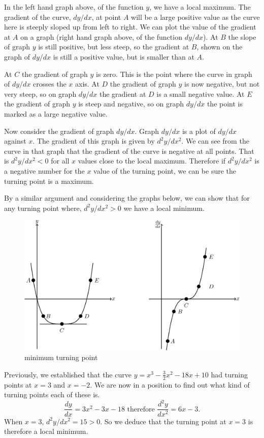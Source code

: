 \documentclass[
  11pt,
  oneside]{book}
\newcommand{\slide}{}
\theoremstyle{definition}
\theoremstyle{definition}
\theoremstyle{definition}
\theoremstyle{definition}
\theoremstyle{remark}
\begin{document}
In the left hand graph above, of the function \(y\), we have a local maximum. The gradient of the curve, \(dy/dx\), at point \(A\) will be a large positive value as the curve here is steeply sloped up from left to right. We can plot the value of the gradient at \(A\) on a graph (right hand graph above, of the function \(dy/dx\)). At \(B\) the slope of graph \(y\) is still positive, but less steep, so the gradient at \(B\), shown on the graph of \(dy/dx\) is still a positive value, but is smaller than at \(A\).

At \(C\) the gradient of graph \(y\) is zero. This is the point where the curve in graph of \(dy/dx\) crosses the \(x\) axis. At \(D\) the gradient of graph \(y\) is now negative, but not very steep, so on graph \(dy/dx\) the gradient at \(D\) is a small negative value. At \(E\) the gradient of graph \(y\) is steep and negative, so on graph \(dy/dx\) the point is marked as a large negative value.

Now consider the gradient of graph \(dy/dx\). Graph \(dy/dx\) is a plot of \(dy/dx\) against \(x\). The gradient of this graph is given by \(d^2y/dx^2\). We can see from the curve in that graph that the gradient of the curve is negative at all points. That is \(d^2y/dx^2<0\) for all \(x\) values close to the local maximum. Therefore if \(d^2y/dx^2\) is a negative number for the \(x\) value of the turning point, we can be sure the turning point is a maximum.
\slide

By a similar argument and considering the graphs below, we can show that for any turning point where, \(d^2y/dx^2>0\) we have a local minimum.

\begin{figure}

{\centering \includegraphics[width=0.6\linewidth]{tikztopng-figure9} 

}

\caption{minimum turning point}\label{fig:unnamed-chunk-19}
\end{figure}
\slide

Previously, we established that the curve \(y = x^3-\frac32 x^2-18x+10\) had turning points at \(x=3\) and \(x=-2\). We are now in a position to find out what kind of turning points each of these is.
\[
\frac{dy}{dx} = 3x^2-3x-18\text{ therefore } \frac{d^2y}{dx^2} = 6x-3.
\]
When \(x = 3\), \(d^2y/dx^2=15 > 0\). So we deduce that the turning point at \(x=3\) is therefore a local minimum.
\end{document}
